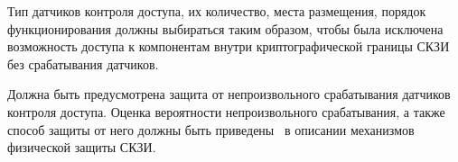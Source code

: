 \label{R.PS.SensorsQuality} %
Тип датчиков контроля доступа, их количество, места размещения, порядок
функционирования должны выбираться таким образом, чтобы была исключена
возможность доступа к компонентам внутри криптографической границы СКЗИ без
срабатывания датчиков.

\label{R.PS.SensorsFaults} %
Должна быть предусмотрена защита от непроизвольного срабатывания датчиков
контроля доступа. Оценка вероятности непроизвольного срабатывания, а также
способ защиты от него должны быть приведены~ в описании
механизмов физической защиты СКЗИ.


